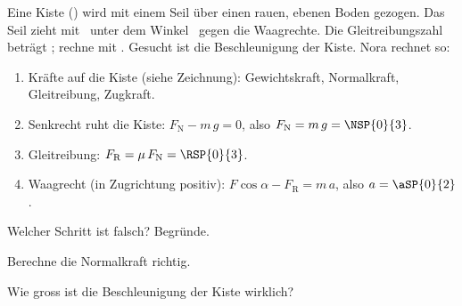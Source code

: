 Eine Kiste (\mKO) wird mit einem Seil über einen rauen, ebenen Boden gezogen. Das Seil zieht mit \FZO\ unter dem Winkel \alO\ gegen die Waagrechte. Die Gleitreibungszahl beträgt \muGO; rechne mit \gO. Gesucht ist die Beschleunigung der Kiste. Nora rechnet so:

\begin{center}
\end{center}

\begin{enumerate}
\item Kräfte auf die Kiste (siehe Zeichnung): Gewichtskraft, Normalkraft, Gleitreibung, Zugkraft.
\item Senkrecht ruht die Kiste: $F_\mathrm{N} - m\,g = 0$, also $F_\mathrm{N} = m\,g = \NSP{0}{3}$.
\item Gleitreibung: $F_\mathrm{R} = \mu\,F_\mathrm{N} = \RSP{0}{3}$.
\item Waagrecht (in Zugrichtung positiv): $F\cos\alpha - F_\mathrm{R} = m\,a$, also $a = \aSP{0}{2}$.
\end{enumerate}

\begin{abcliste}
\abc
Welcher Schritt ist falsch? Begründe.

\abc
Berechne die Normalkraft richtig.

\abc
Wie gross ist die Beschleunigung der Kiste wirklich?
\end{abcliste}
